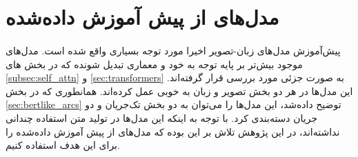 \section{ مدل‌های از پیش آموزش‌ داده‌شده}
\label{sec:vlp}
\paragraph{}
{
    پیش‌آموزش مدل‌های زبان-تصویر اخیرا مورد توجه بسیاری واقع شده است. مدل‌های 
    موجود بیش‌تر بر پایه توجه به خود و معماری تبدیل شونده که در بخش ‌های
    \ref{subsec:self_attn}
    و
    \ref{sec:transformers}
    به صورت جزئی مورد بررسی قرار گرفته‌اند. این مدل‌ها در هر دو بخش 
    تصویر و زبان به خوبی عمل کرده‌اند. 
    همانطوری که در بخش
    \ref{sec:bertlike_arcs}
    توضیح داده‌شد، این مدل‌ها را می‌توان به دو بخش تک‌جریان و دو جریان دسته‌بندی 
    کرد. 
    با توجه به اینکه این مدل‌ها در تولید متن استفاده چندانی نداشته‌اند، در این
    پژوهش تلاش بر این بوده که مدل‌های از‌ پیش آموزش داده‌شده را برای این هدف 
    استفاده کنیم. 
}